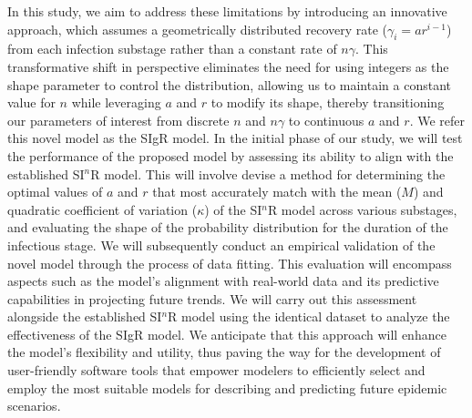 \documentclass[12pt]{article}
\begin{document}
In this study, we aim to address these limitations by introducing an innovative approach, which assumes a geometrically distributed recovery rate ($\gamma_i = ar^{i-1}$) from each infection substage rather than a constant rate of $n\gamma$. This transformative shift in perspective eliminates the need for using integers as the shape parameter to control the distribution, allowing us to maintain a constant value for $n$ while leveraging $a$ and $r$ to modify its shape, thereby transitioning our parameters of interest from discrete $n$ and $n\gamma$ to continuous $a$ and $r$. We refer this novel model as the SIgR model. In the initial phase of our study, we will test the performance of the proposed model by assessing its ability to align with the established SI$^n$R model. This will involve devise a method for determining the optimal values of $a$ and $r$ that most accurately match with the mean ($M$) and quadratic coefficient of variation ($\kappa$) of the SI$^n$R model across various substages, and evaluating the shape of the probability distribution for the duration of the infectious stage. We will subsequently conduct an empirical validation of the novel model through the process of data fitting. This evaluation will encompass aspects such as the model's alignment with real-world data and its predictive capabilities in projecting future trends. We will carry out this assessment alongside the established SI$^n$R model using the identical dataset to analyze the effectiveness of the SIgR model. We anticipate that this approach will enhance the model's flexibility and utility, thus paving the way for the development of user-friendly software tools that empower modelers to efficiently select and employ the most suitable models for describing and predicting future epidemic scenarios.
\pagebreak
\end{document}
